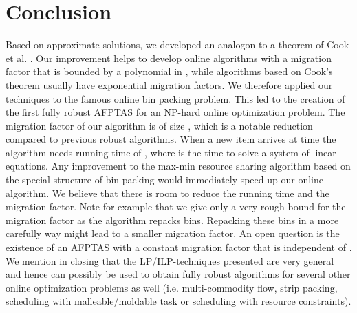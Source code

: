 \documentclass[a4paper,11pt]{article}
\begin{document}
\section{Conclusion}
Based on approximate solutions, we developed an analogon to a theorem of Cook et al. \cite{cook1986sensitivity}. 
Our improvement
helps to develop online algorithms with a migration factor that is bounded by a polynomial
in , while algorithms based on Cook's theorem usually have exponential migration factors. 
We therefore applied our techniques to the famous online bin packing problem.
This led to the creation of the first fully robust AFPTAS for an NP-hard online optimization problem.
The migration factor of our algorithm is of size , which is a notable 
reduction compared to previous robust algorithms.
When a new item arrives at time  the algorithm needs
running time of , where  is the time to solve a system 
of  linear equations.
Any improvement to the max-min resource sharing algorithm based on the special structure of bin packing would 
immediately speed up our online algorithm. We believe that there is room to reduce
the running time and the migration factor. Note for example that we give only a very rough bound for the
migration factor as the algorithm repacks  bins. Repacking these bins in a more
carefully way might lead to a smaller migration factor.
An open question is the existence of an 
AFPTAS with a constant migration factor that is 
independent of .
We mention in closing that the LP/ILP-techniques presented are very general and hence can possibly be used
to obtain
fully robust algorithms for several other online optimization problems as well (i.e. multi-commodity flow, 
strip packing, scheduling with malleable/moldable task or scheduling with resource constraints).



\end{document}
